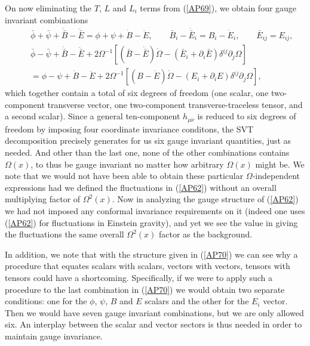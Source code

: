 \documentclass[aps]{revtex4}
\begin{document}
On now eliminating the $T$, $L$ and $L_i$ terms from (\ref{AP69}), we obtain four gauge invariant combinations 
\begin{eqnarray}
&&\bar{\phi}+\bar{\psi}+\dot{\bar{B}}-\ddot{\bar{E}}=\phi+\psi+\dot{B}-\ddot{E},\qquad \bar{B}_i-\dot{\bar{E}}_i=B_i-\dot{E}_i,\qquad \bar{E}_{ij}=E_{ij},
\nonumber\\
&&\bar{\phi}-\bar{\psi}+\dot{\bar{B}}-\ddot{\bar{E}}+2\Omega^{-1}\left[(\bar{B}-\dot{\bar{E}})\dot{\Omega}
-(\bar{E}_i+\partial_i\bar{E})\delta^{ij}\partial_j\Omega\right]
\nonumber\\
&&=\phi-\psi+\dot{B}-\ddot{E}+2\Omega^{-1}\left[(B-\dot{E})\dot{\Omega}
-(E_i+\partial_iE)\delta^{ij}\partial_j\Omega\right],
\label{AP70}
\end{eqnarray}
%
which together contain a total of six degrees of freedom (one scalar, one two-component transverse vector, one two-component transverse-traceless tensor, and a second scalar).  Since a general ten-component $h_{\mu\nu}$ is reduced to six degrees of freedom by imposing four coordinate invariance conditons, the SVT decomposition precisely generates for us six gauge invariant quantities, just as needed. And other than the last one,  none of the other combinations contains $\Omega(x)$, to thus be gauge invariant no matter how arbitrary $\Omega(x)$ might be. We note that we would not have been able to obtain these particular $\Omega$-independent expressions had we defined the fluctuations in (\ref{AP62}) without an overall multiplying factor of $\Omega^2(x)$. Now in analyzing the gauge structure of (\ref{AP62}) we had not imposed any conformal invariance requirements on it (indeed one uses (\ref{AP62}) for fluctuations in Einstein gravity), and yet we see the value in giving the fluctuations the same overall $\Omega^2(x)$ factor as the background. 

In addition, we note that with the structure given in  (\ref{AP70}) we can see why  a procedure that equates scalars with scalars, vectors with vectors, tensors with tensors could have a shortcoming. Specifically, if we were to apply such a procedure to the last combination in (\ref{AP70}) we would obtain two separate conditions: one for the $\phi$, $\psi$, $B$ and $E$ scalars and the other for the $E_i$ vector. Then we would have seven gauge invariant combinations, but we are only allowed six. An interplay between the scalar and vector sectors is thus needed in order to maintain gauge invariance.
\end{document}
